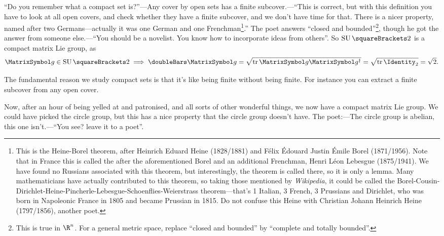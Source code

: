 \documentclass[10pt, a4paper, twoside]{lecturenotes}
\newcommand{\Rn}{{\R^n}}
\begin{document}
\begin{lecture}[date=2013-04-23]
``Do you remember what a compact set is?''---Any cover by open sets has a finite subcover.---``This is correct, but with this definition you have to look at all open covers, and check whether they have a finite subcover, and we don't have time for that. There is a nicer property, named after two Germans---actually it was one German and one Frenchman\footnote{This is the Heine-Borel theorem, after Heinrich Eduard Heine (1828/1881) and Félix Édouard Justin Émile Borel (1871/1956). Note that in France this is called the  after the aforementioned Borel and an additional Frenchman, Henri Léon Lebesgue (1875/1941). We have found no Russians associated with this theorem, but interestingly, the theorem is called  there, so it is only a lemma. Many mathematicians have actually contributed to this theorem, so taking those mentioned by \emph{Wikipedia}, it could be called the Borel-Cousin-Dirichlet-Heine-Pincherle-Lebesgue-Schoenflies-Weierstrass theorem---that's 1 Italian, 3 French, 3 Prussians and Dirichlet, who was born in Napoleonic France in 1805 and became  Prussian in 1815. Do not confuse this Heine with Christian Johann Heinrich Heine (1797/1856), another poet.}.'' The poet answers ``closed and bounded''\footnote{This is true in $\Rn$. For a general metric space, replace ``closed and bounded'' by ``complete and totally bounded''.}, though he got the answer from someone else.---``You should be a novelist. You know how to incorporate ideas from others''. So $\SpecialUnitaryGroup\of{2}$ is a compact matrix Lie group, as \[
\matg\in\SpecialUnitaryGroup\of 2 \Implies \FrobeniusNorm\matg = \sqrt{\Trace \matg\adj\matg} = \sqrt{\Trace \Identity_2} = \sqrt{2}\text.
\]

The fundamental reason we study compact sets is that it's like being finite without being finite. For instance you can extract a finite subcover from any open cover.

Now, after an hour of being yelled at and patronised, and all sorts of other wonderful things,  we now have a compact matrix Lie group. We could have picked the circle group, but this has a nice property that the circle group doesn't have. The poet:---The circle group is abelian, this one isn't.---``You see? leave it to a poet''.
\end{lecture}
\end{document}
